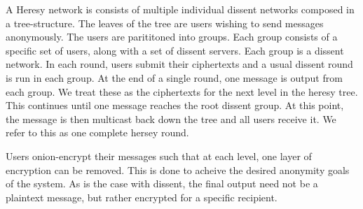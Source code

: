 A Heresy network is consists of multiple individual dissent networks composed in a tree-structure. The leaves of the tree are users wishing to send messages anonymously. The users are parititoned into groups. Each group consists of a specific set of users, along with a set of dissent servers. Each group is a dissent network. In each round, users submit their ciphertexts and a usual dissent round is run in each group. At the end of a single round, one message is output from each group. We treat these as the ciphertexts for the next level in the heresy tree. This continues until one message reaches the root dissent group. At this point, the message is then multicast back down the tree and all users receive it. We refer to this as one complete hersey round.

Users onion-encrypt their messages such that at each level, one layer of encryption can be removed. This is done to acheive the desired anonymity goals of the system. As is the case with dissent, the final output need not be a plaintext message, but rather encrypted for a specific recipient.


